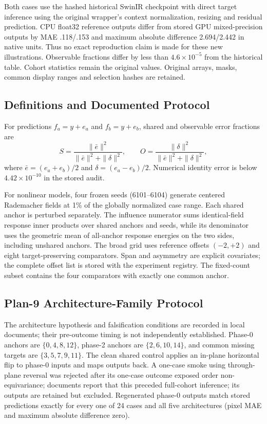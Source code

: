 Both cases use the hashed historical SwinIR checkpoint with direct target inference using the original wrapper's context normalization, resizing and residual prediction. CPU float32 reference outputs differ from stored GPU mixed-precision outputs by MAE .118/.153 and maximum absolute difference 2.694/2.442 in native units. Thus no exact reproduction claim is made for these new illustrations. Observable fractions differ by less than $4.6\times10^{-5}$ from the historical table. Cohort statistics remain the original values. Original arrays, masks, common display ranges and selection hashes are retained.

\subsection{Definitions and Documented Protocol}
For predictions $f_a=y+e_a$ and $f_b=y+e_b$, shared and observable error fractions are
\begin{equation}
S=\frac{\|\bar e\|^2}{\|\bar e\|^2+\|\delta\|^2},\qquad
O=\frac{\|\delta\|^2}{\|\bar e\|^2+\|\delta\|^2},
\end{equation}
where $\bar e=(e_a+e_b)/2$ and $\delta=(e_a-e_b)/2$. Numerical identity error is below $4.42\times10^{-10}$ in the stored audit.

For nonlinear models, four frozen seeds (6101--6104) generate centered Rademacher fields at 1\% of the globally normalized case range. Each shared anchor is perturbed separately. The influence numerator sums identical-field response inner products over shared anchors and seeds, while its denominator uses the geometric mean of all-anchor response energies on the two sides, including unshared anchors. The broad grid uses reference offsets $(-2,+2)$ and eight target-preserving comparators. Span and asymmetry are explicit covariates; the complete offset list is stored with the experiment registry. The fixed-count subset contains the four comparators with exactly one common anchor.

\subsection{Plan-9 Architecture-Family Protocol}
The architecture hypothesis and falsification conditions are recorded in local documents; their pre-outcome timing is not independently established. Phase-0 anchors are $\{0,4,8,12\}$, phase-2 anchors are $\{2,6,10,14\}$, and common missing targets are $\{3,5,7,9,11\}$. The clean shared control applies an in-plane horizontal flip to phase-0 inputs and maps outputs back. A one-case smoke using through-plane reversal was rejected after its one-case outcome exposed order non-equivariance; documents report that this preceded full-cohort inference; its outputs are retained but excluded. Regenerated phase-0 outputs match stored predictions exactly for every one of 24 cases and all five architectures (pixel MAE and maximum absolute difference zero).

